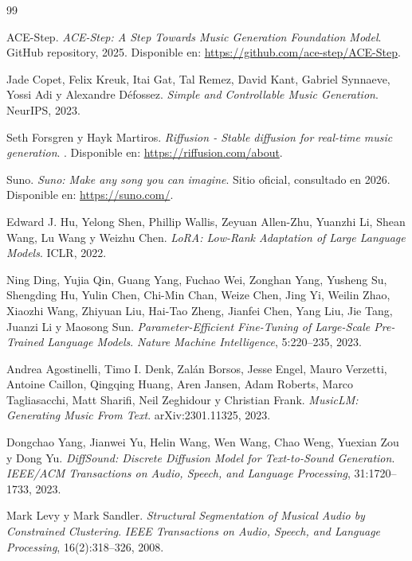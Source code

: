 \documentclass[%
    school=etsisi,%
    type=pfg,%
    degree=61CD,%
]{upm-report}
\begin{document}
\begin{thebibliography}{99}

ACE-Step.
\newblock \emph{ACE-Step: A Step Towards Music Generation Foundation Model}.
\newblock GitHub repository, 2025.
\newblock Disponible en: \url{https://github.com/ace-step/ACE-Step}.

Jade Copet, Felix Kreuk, Itai Gat, Tal Remez, David Kant, Gabriel Synnaeve, Yossi Adi y Alexandre D\'efossez.
\newblock \emph{Simple and Controllable Music Generation}.
\newblock NeurIPS, 2023.

Seth Forsgren y Hayk Martiros.
\newblock \emph{Riffusion - Stable diffusion for real-time music generation}.
.
\newblock Disponible en: \url{https://riffusion.com/about}.

Suno.
\newblock \emph{Suno: Make any song you can imagine}.
\newblock Sitio oficial, consultado en 2026.
\newblock Disponible en: \url{https://suno.com/}.

Edward J. Hu, Yelong Shen, Phillip Wallis, Zeyuan Allen-Zhu, Yuanzhi Li, Shean Wang, Lu Wang y Weizhu Chen.
\newblock \emph{LoRA: Low-Rank Adaptation of Large Language Models}.
\newblock ICLR, 2022.

Ning Ding, Yujia Qin, Guang Yang, Fuchao Wei, Zonghan Yang, Yusheng Su, Shengding Hu, Yulin Chen, Chi-Min Chan, Weize Chen, Jing Yi, Weilin Zhao, Xiaozhi Wang, Zhiyuan Liu, Hai-Tao Zheng, Jianfei Chen, Yang Liu, Jie Tang, Juanzi Li y Maosong Sun.
\newblock \emph{Parameter-Efficient Fine-Tuning of Large-Scale Pre-Trained Language Models}.
\newblock \textit{Nature Machine Intelligence}, 5:220--235, 2023.

Andrea Agostinelli, Timo I. Denk, Zal\'an Borsos, Jesse Engel, Mauro Verzetti, Antoine Caillon, Qingqing Huang, Aren Jansen, Adam Roberts, Marco Tagliasacchi, Matt Sharifi, Neil Zeghidour y Christian Frank.
\newblock \emph{MusicLM: Generating Music From Text}.
\newblock arXiv:2301.11325, 2023.

Dongchao Yang, Jianwei Yu, Helin Wang, Wen Wang, Chao Weng, Yuexian Zou y Dong Yu.
\newblock \emph{DiffSound: Discrete Diffusion Model for Text-to-Sound Generation}.
\newblock \textit{IEEE/ACM Transactions on Audio, Speech, and Language Processing}, 31:1720--1733, 2023.

Mark Levy y Mark Sandler.
\newblock \emph{Structural Segmentation of Musical Audio by Constrained Clustering}.
\newblock \textit{IEEE Transactions on Audio, Speech, and Language Processing}, 16(2):318--326, 2008.


\end{thebibliography}
\end{document}
